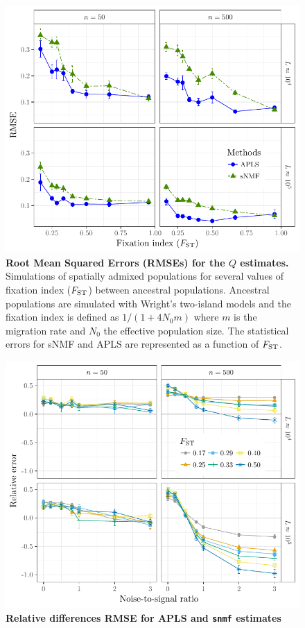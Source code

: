 \begin{figure}
  \centering
  \includegraphics[width=\textwidth]{./Figures/figure2.pdf}
  \caption{{\bf Root Mean Squared Errors (RMSEs) for the $Q$ estimates.}
    Simulations of spatially admixed populations for several values of fixation
    index ($F_{\rm ST}$) between ancestral populations. Ancestral populations
    are simulated with Wright's two-island models and the fixation index is
    defined as $1 / (1 + 4 N_0 m)$ where $m$ is the migration rate and $N_0$ the
    effective population size. The statistical errors for sNMF and APLS are
    represented as a function of $F_{\rm ST}$. }
  \label{fig:fig2}
\end{figure}  

\clearpage 
\newpage

\begin{figure}
  \centering
  \includegraphics[width=\textwidth]{./Figures/figure2_5.pdf}
  \caption{{\bf Relative differences RMSE for APLS and {\tt snmf} estimates}}
  \label{fig:fig2_5}
\end{figure}  

